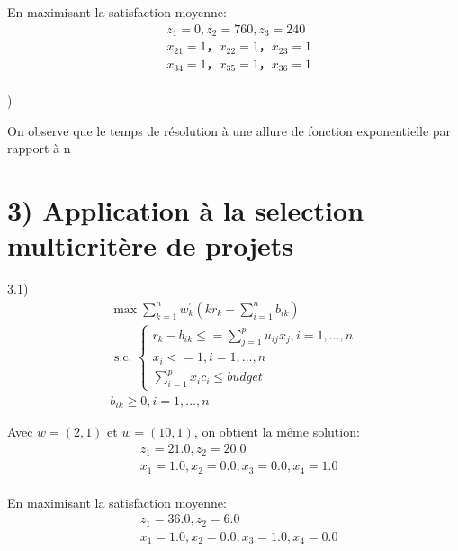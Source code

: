 \documentclass[11pt,A4,french]{article}
\begin{document}
En maximisant la satisfaction moyenne:
\begin{align*}
&z_1 = 0,
z_2 = 760,
z_3 = 240\\
&x_{21} = 1，x_{22} = 1， x_{23} = 1 \\
&x_{34} = 1，x_{35} = 1， x_{36} = 1 \\
\end{align*}

)

\centerline{}
On observe que le temps de résolution à une allure de fonction exponentielle par rapport à n


\section*{3) Application à la selection multicritère de projets}

3.1)
$$
\begin{gathered}
\max \sum_{k=1}^{n} w_{k}^{\prime}\left(k r_{k}-\sum_{i=1}^{n} b_{i k}\right) \\
\text { s.c. }\left\{\begin{array}{l}
r_{k}-b_{i k} \leq = \sum_{j=1}^{p} u_{i j}x_j, i=1, \ldots, n \\
x_i <= 1, i=1, \ldots, n \\
\sum_{i=1}^{p} x_ic_i\leq budget
\end{array}\right. \\
b_{i k} \geq 0, i=1, \ldots, n
\end{gathered}
$$

Avec $w=(2,1)$ et $w=(10,1)$, on obtient la même solution:
\begin{align*}
&z_1 = 21.0, z_2 = 20.0\\
&x_1 = 1.0, x_2 = 0.0, x_3 = 0.0, x_4 = 1.0\\
\end{align*}

En maximisant la satisfaction moyenne:
\begin{align*}
&z_1 = 36.0, z_2 = 6.0\\
&x_1 = 1.0, x_2 = 0.0, x_3 = 1.0, x_4 = 0.0 \\
\end{align*}

\newpage
\end{document}
